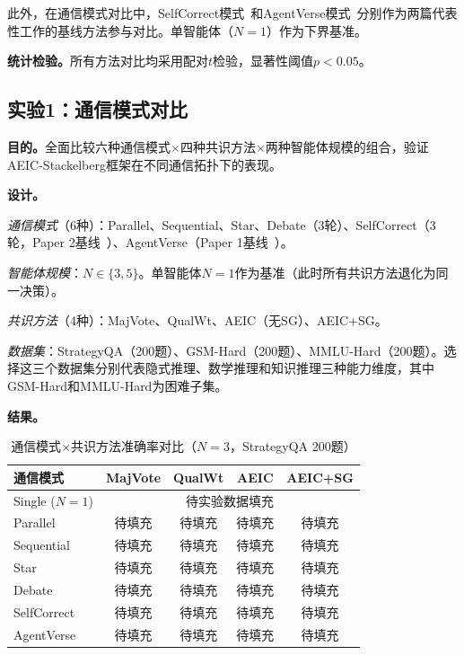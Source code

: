 \documentclass[12pt,a4paper,UTF8,fontset=fandol]{ctexart}
\begin{document}
此外，在通信模式对比中，SelfCorrect模式~\cite{bertalanic2026cost}和AgentVerse模式~\cite{chen2023agentverse}分别作为两篇代表性工作的基线方法参与对比。单智能体（$N=1$）作为下界基准。

\textbf{统计检验。}所有方法对比均采用配对$t$检验，显著性阈值$p < 0.05$。

\subsection{实验1：通信模式对比}\label{sec:exp1}

\textbf{目的。}全面比较六种通信模式$\times$四种共识方法$\times$两种智能体规模的组合，验证AEIC-Stackelberg框架在不同通信拓扑下的表现。

\textbf{设计。}

\textit{通信模式}（6种）：Parallel、Sequential、Star、Debate（3轮）、SelfCorrect（3轮，Paper 2基线~\cite{bertalanic2026cost}）、AgentVerse（Paper 1基线~\cite{chen2023agentverse}）。

\textit{智能体规模}：$N \in \{3, 5\}$。单智能体$N=1$作为基准（此时所有共识方法退化为同一决策）。

\textit{共识方法}（4种）：MajVote、QualWt、AEIC（无SG）、AEIC+SG。

\textit{数据集}：StrategyQA（200题）、GSM-Hard（200题）、MMLU-Hard（200题）。选择这三个数据集分别代表隐式推理、数学推理和知识推理三种能力维度，其中GSM-Hard和MMLU-Hard为困难子集。

\textbf{结果。}

\begin{table}[H]
\centering
\caption{通信模式$\times$共识方法准确率对比（$N=3$，StrategyQA 200题）}\label{tab:exp1_sqa}
\begin{tabular}{lcccc}
\toprule
通信模式 & MajVote & QualWt & AEIC & AEIC+SG \\
\midrule
Single ($N=1$) & \multicolumn{4}{c}{待实验数据填充} \\
Parallel & 待填充 & 待填充 & 待填充 & 待填充 \\
Sequential & 待填充 & 待填充 & 待填充 & 待填充 \\
Star & 待填充 & 待填充 & 待填充 & 待填充 \\
Debate & 待填充 & 待填充 & 待填充 & 待填充 \\
SelfCorrect & 待填充 & 待填充 & 待填充 & 待填充 \\
AgentVerse & 待填充 & 待填充 & 待填充 & 待填充 \\
\bottomrule
\end{tabular}
\end{table}
\end{document}
